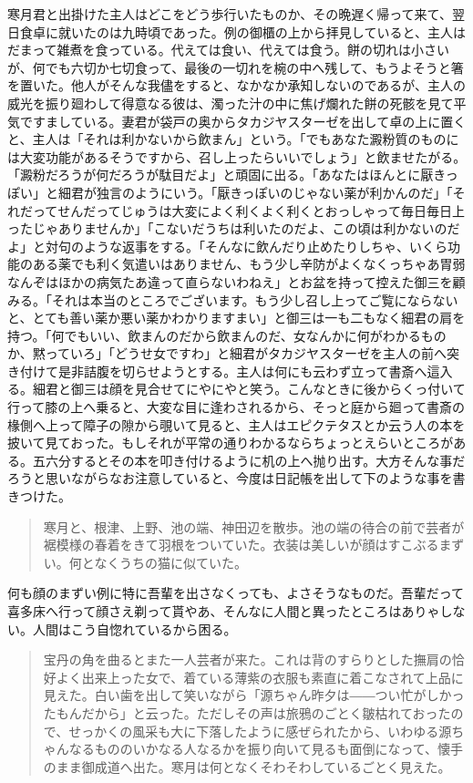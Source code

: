 \documentclass[12pt, openright]{book}
\begin{document}
寒月君と出掛けた主人はどこをどう歩行いたものか、その晩遅く帰って来て、翌日食卓に就いたのは九時頃であった。例の御櫃の上から拝見していると、主人はだまって雑煮を食っている。代えては食い、代えては食う。餅の切れは小さいが、何でも六切か七切食って、最後の一切れを椀の中へ残して、もうよそうと箸を置いた。他人がそんな我儘をすると、なかなか承知しないのであるが、主人の威光を振り廻わして得意なる彼は、濁った汁の中に焦げ爛れた餅の死骸を見て平気ですましている。妻君が袋戸の奥からタカジヤスターゼを出して卓の上に置くと、主人は「それは利かないから飲まん」という。「でもあなた澱粉質のものには大変功能があるそうですから、召し上ったらいいでしょう」と飲ませたがる。「澱粉だろうが何だろうが駄目だよ」と頑固に出る。「あなたはほんとに厭きっぽい」と細君が独言のようにいう。「厭きっぽいのじゃない薬が利かんのだ」「それだってせんだってじゅうは大変によく利くよく利くとおっしゃって毎日毎日上ったじゃありませんか」「こないだうちは利いたのだよ、この頃は利かないのだよ」と対句のような返事をする。「そんなに飲んだり止めたりしちゃ、いくら功能のある薬でも利く気遣いはありません、もう少し辛防がよくなくっちゃあ胃弱なんぞはほかの病気たあ違って直らないわねえ」とお盆を持って控えた御三を顧みる。「それは本当のところでございます。もう少し召し上ってご覧にならないと、とても善い薬か悪い薬かわかりますまい」と御三は一も二もなく細君の肩を持つ。「何でもいい、飲まんのだから飲まんのだ、女なんかに何がわかるものか、黙っていろ」「どうせ女ですわ」と細君がタカジヤスターゼを主人の前へ突き付けて是非詰腹を切らせようとする。主人は何にも云わず立って書斎へ這入る。細君と御三は顔を見合せてにやにやと笑う。こんなときに後からくっ付いて行って膝の上へ乗ると、大変な目に逢わされるから、そっと庭から廻って書斎の椽側へ上って障子の隙から覗いて見ると、主人はエピクテタスとか云う人の本を披いて見ておった。もしそれが平常の通りわかるならちょっとえらいところがある。五六分するとその本を叩き付けるように机の上へ抛り出す。大方そんな事だろうと思いながらなお注意していると、今度は日記帳を出して下のような事を書きつけた。

\blockquote{寒月と、根津、上野、池の端、神田辺を散歩。池の端の待合の前で芸者が裾模様の春着をきて羽根をついていた。衣装は美しいが顔はすこぶるまずい。何となくうちの猫に似ていた。}

何も顔のまずい例に特に吾輩を出さなくっても、よさそうなものだ。吾輩だって喜多床へ行って顔さえ剃って貰やあ、そんなに人間と異ったところはありゃしない。人間はこう自惚れているから困る。

\blockquote{宝丹の角を曲るとまた一人芸者が来た。これは背のすらりとした撫肩の恰好よく出来上った女で、着ている薄紫の衣服も素直に着こなされて上品に見えた。白い歯を出して笑いながら「源ちゃん昨夕は――つい忙がしかったもんだから」と云った。ただしその声は旅鴉のごとく皺枯れておったので、せっかくの風采も大に下落したように感ぜられたから、いわゆる源ちゃんなるもののいかなる人なるかを振り向いて見るも面倒になって、懐手のまま御成道へ出た。寒月は何となくそわそわしているごとく見えた。}
\end{document}
